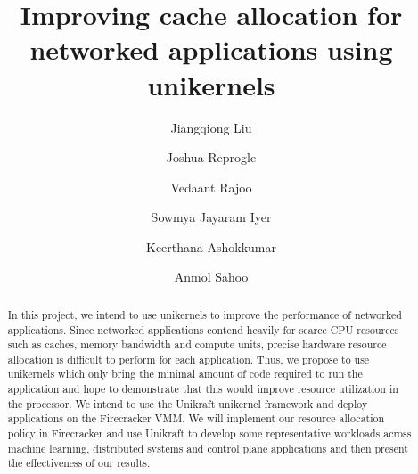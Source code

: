 \documentclass[sigconf,authorversion,noacm]{acmart}
\begin{document}
\title{Improving cache allocation for networked applications using unikernels}

\author{Jiangqiong Liu}

\author{Joshua Reprogle}

\author{Vedaant Rajoo}

\author{Sowmya Jayaram Iyer}

\author{Keerthana Ashokkumar}

\author{Anmol Sahoo}

\renewcommand{\shortauthors}{Liu et al.}

\begin{abstract}
In this project, we intend to use unikernels to improve the performance of
networked applications. Since networked applications contend heavily for
scarce CPU resources such as caches, memory bandwidth and compute units,
precise hardware resource allocation is difficult to perform for each
application. Thus, we propose to use unikernels which only bring the minimal
amount of code required to run the application and hope to demonstrate that
this would improve resource utilization in the processor. We intend to use
the Unikraft unikernel framework and deploy applications on the Firecracker
VMM. We will implement our resource allocation policy in Firecracker and use
Unikraft to develop some representative workloads across machine learning,
distributed systems and control plane applications and then present the
effectiveness of our results.
\end{abstract}
\end{document}

